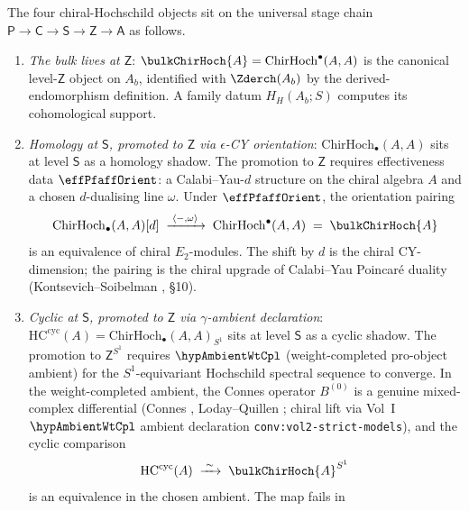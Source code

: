 \begin{theorem}
\label{thm:cyclic-hochschild-stage-stratification}%
%
%
The four chiral-Hochschild objects sit on the universal stage chain
$\mathsf{P} \to \mathsf{C} \to \mathsf{S} \to \mathsf{Z} \to \mathsf{A}$
as follows.
\begin{enumerate}[label=\textup{(\roman*)}]
\item \emph{The bulk lives at $\mathsf{Z}$}:
$\bulkChirHoch{A} = \mathrm{ChirHoch}^{\bullet}(A, A)$ is the
canonical level-$\mathsf{Z}$ object on $A_b$, identified with
$\Zderch(A_b)$ by the derived-endomorphism definition.  A family datum
$H_H(A_b;S)$ computes its cohomological support.
\item \emph{Homology at $\mathsf{S}$, promoted to $\mathsf{Z}$ via
$\epsilon$-CY orientation}:
$\mathrm{ChirHoch}_{\bullet}(A, A)$ sits at level $\mathsf{S}$ as a
homology shadow. The promotion to $\mathsf{Z}$ requires effectiveness
data $\effPfaffOrient$: a Calabi--Yau-$d$ structure on the chiral
algebra $A$ and a chosen $d$-dualising line $\omega$. Under
$\effPfaffOrient$, the orientation pairing
\[
\mathrm{ChirHoch}_{\bullet}(A, A)[d]
 \;\xrightarrow{\;\langle -, \omega\rangle\;}\;
 \mathrm{ChirHoch}^{\bullet}(A, A) \;=\; \bulkChirHoch{A}
\]
is an equivalence of chiral $E_2$-modules. The shift by $d$ is the
chiral CY-dimension; the pairing is the chiral upgrade of
Calabi--Yau Poincar\'e duality
\textup(Kontsevich--Soibelman \cite{KS09}, \S 10\textup).
\item \emph{Cyclic at $\mathsf{S}$, promoted to $\mathsf{Z}$ via
$\gamma$-ambient declaration}: $\mathrm{HC}^{\mathrm{cyc}}(A) =
\mathrm{ChirHoch}_{\bullet}(A, A)_{S^1}$ sits at level $\mathsf{S}$ as
a cyclic shadow. The promotion to $\mathsf{Z}^{S^1}$ requires
$\hypAmbientWtCpl$ (weight-completed pro-object ambient) for the
$S^1$-equivariant Hochschild spectral sequence to converge. In the
weight-completed ambient, the Connes operator $B^{(0)}$ is a genuine
mixed-complex differential (Connes \cite{Con85}, Loday--Quillen
\cite{LQ84}; chiral lift via Vol~I
$\hypAmbientWtCpl$ ambient declaration \texttt{conv:vol2-strict-models}),
and the cyclic comparison
\[
\mathrm{HC}^{\mathrm{cyc}}(A)
 \;\xrightarrow{\;\sim\;}\;
 \bulkChirHoch{A}^{S^1}
\]
is an equivalence in the chosen ambient. The map fails in

\end{enumerate}
\end{theorem}
